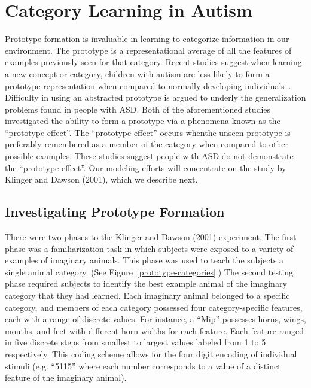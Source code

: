 %
%

\section{Category Learning in Autism}

Prototype formation is invaluable in learning to categorize information in our environment.  The prototype is a representational average of all the features of examples previously seen for that category. Recent studies suggest when learning a new concept or category, children with autism are less likely to form a prototype representation when compared to normally developing individuals~\cite{RefWorks:113,StraussMS:2009:Prototype}.  Difficulty in using an abstracted prototype is argued to underly the generalization problems found in people with ASD.  Both of the aforementioned studies investigated the ability to form a prototype via a phenomena known as the ``prototype effect''.  The ``prototype effect'' occurs whenthe unseen prototype is preferably remembered as a member of the category when compared to other possible examples.  These studies suggest people with ASD do not demonstrate the ``prototype effect''.  Our modeling efforts will concentrate on the study by Klinger and Dawson (2001), which we describe next. 

\subsection{Investigating Prototype Formation}
There were two phases to the Klinger and Dawson (2001) experiment.  The first phase was a familiarization task in which subjects were exposed to a variety of examples of imaginary animals.  This phase was used to teach the subjects a single animal category. (See Figure~\ref{prototype-categories}.) The second testing phase required subjects to identify the best example animal of the imaginary category that they had learned.   Each imaginary animal belonged to a specific category, and members of each category possessed four category-specific features, each with a range of discrete values.  For instance, a ``Mip'' possesses horns, wings, mouths, and feet with different horn widths for each feature.  Each feature ranged in five discrete steps from smallest to largest values labeled from 1 to 5 respectively. This coding scheme allows for the four digit encoding of individual stimuli (e.g. ``5115'' where each number corresponds to a value of a distinct feature of the imaginary animal). 

